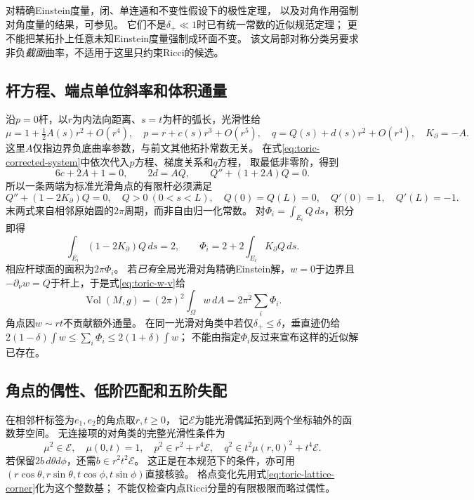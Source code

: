 \documentclass[UTF8,a4paper,11pt,fontset=fandol]{ctexart}
\numberwithin{equation}{section}
\theoremstyle{definition}
\newcommand{\Vol}{\operatorname{Vol}}
\begin{document}
对精确Einstein度量，闭、单连通和不变性假设下的极性定理，
以及对角作用强制对角度量的结果，可参见\cite[Theorem 1.2、\S6 Proposition 5]{Liu2025}。
它们不是$\delta_+\ll1$时已有统一常数的近似规范定理；
更不能把某拓扑上任意未知Einstein度量强制成环面不变。
该文局部对称分类另要求非负\emph{截面}曲率，不适用于这里只约束Ricci的候选。

\subsection{杆方程、端点单位斜率和体积通量}
沿$p=0$杆，以$r$为内法向距离、$s=t$为杆的弧长，光滑性给
\begin{equation}\label{eq:toric-edge-jets}
 \mu=1+\tfrac12 A(s)r^2+O(r^4),\quad
 p=r+c(s)r^3+O(r^5),\quad
 q=Q(s)+d(s)r^2+O(r^4),\quad K_\partial=-A.
\end{equation}
这里$A$仅指边界负底曲率参数，与前文其他拓扑常数无关。
在式\eqref{eq:toric-corrected-system}中依次代入$p$方程、梯度关系和$q$方程，
取最低非零阶，得到
\[
 6c+2A+1=0,\qquad 2d=AQ,\qquad Q''+(1+2A)Q=0.
\]
所以一条两端为标准光滑角点的有限杆必须满足
\begin{equation}\label{eq:toric-edge-ode}
 Q''+(1-2K_\partial)Q=0,\quad Q>0\ (0<s<L),\quad
 Q(0)=Q(L)=0,\quad Q'(0)=1,\quad Q'(L)=-1.
\end{equation}
末两式来自相邻原始圆的$2\pi$周期，而非自由归一化常数。
对$\Phi_i=\int_{E_i}Q\,ds$，积分即得
\begin{equation}\label{eq:toric-rod-flux}
 \int_{E_i}(1-2K_\partial)Q\,ds=2,\qquad
 \Phi_i=2+2\int_{E_i}K_\partial Q\,ds.
\end{equation}
相应杆球面的面积为$2\pi\Phi_i$。
若\emph{已有}全局光滑对角精确Einstein解，$w=0$于边界且
$-\partial_\nu w=Q$于杆上，于是式\eqref{eq:toric-w-v}给
\begin{equation}\label{eq:toric-flux-volume}
 \Vol(M,g)=(2\pi)^2\int_\Omega w\,dA
          =2\pi^2\sum_i\Phi_i.
\end{equation}
角点因$w\sim rt$不贡献额外通量。
在同一光滑对角类中若仅$\delta_+\le\delta$，垂直迹仍给
$2(1-\delta)\int w\le\sum_i\Phi_i\le2(1+\delta)\int w$；
不能由指定$\Phi_i$反过来宣布这样的近似解已存在。

\subsection{角点的偶性、低阶匹配和五阶失配}
在相邻杆标签为$e_1,e_2$的角点取$r,t\ge0$，
记$\mathcal E$为能光滑偶延拓到两个坐标轴外的函数芽空间。
无连接项的对角类的完整光滑性条件为
\begin{equation}\label{eq:toric-corner-jets}
 \mu^2\in\mathcal E,\quad\mu(0,t)=1,\quad
 p^2\in r^2+r^4\mathcal E,\quad
 q^2\in t^2\mu(r,0)^2+t^4\mathcal E.
\end{equation}
若保留$2b\,d\theta d\phi$，还需$b\in r^2t^2\mathcal E$。
这正是\cite[Lemma 2.2]{Liu2025}在本规范下的条件，亦可用
$(r\cos\theta,r\sin\theta,t\cos\phi,t\sin\phi)$直接核验。
格点变化先用式\eqref{eq:toric-lattice-corner}化为这个整数基；
不能仅检查内点Ricci分量的有限极限而略过偶性。
\end{document}
